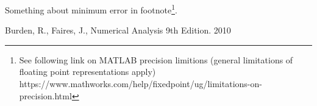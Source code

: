 \documentclass[a4paper]{article}
\begin{document}
Something about minimum error in footnote\footnote{See following link on MATLAB precision limitions (general limitations of floating point representations apply) https://www.mathworks.com/help/fixedpoint/ug/limitations-on-precision.html}.




\newpage
\begin{thebibliography}{9}
  Burden, R., Faires, J., Numerical Analysis 9th Edition. 2010

\end{thebibliography}
\end{document}

